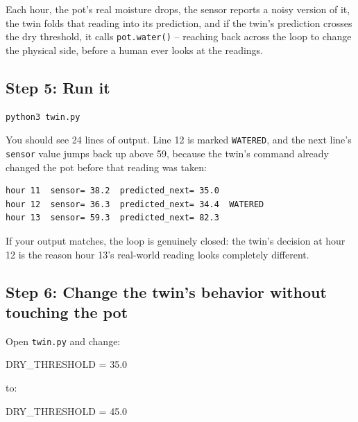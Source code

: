 \documentclass[
  12pt,
  a4paper,
]{article}
\newenvironment{Shaded}{}{}
\newcommand{\FloatTok}[1]{\textcolor[rgb]{0.25,0.63,0.44}{#1}}
\newcommand{\NormalTok}[1]{#1}
\newcommand{\OperatorTok}[1]{\textcolor[rgb]{0.40,0.40,0.40}{#1}}
\begin{document}
Each hour, the pot's real moisture drops, the sensor reports a noisy
version of it, the twin folds that reading into its prediction, and if
the twin's prediction crosses the dry threshold, it calls
\texttt{pot.water()} -- reaching back across the loop to change the
physical side, before a human ever looks at the readings.

\subsection{Step 5: Run it}\label{step-5-run-it}

\begin{verbatim}
python3 twin.py
\end{verbatim}

You should see 24 lines of output. Line 12 is marked \texttt{WATERED},
and the next line's \texttt{sensor} value jumps back up above 59,
because the twin's command already changed the pot before that reading
was taken:

\begin{verbatim}
hour 11  sensor= 38.2  predicted_next= 35.0
hour 12  sensor= 36.3  predicted_next= 34.4  WATERED
hour 13  sensor= 59.3  predicted_next= 82.3
\end{verbatim}

If your output matches, the loop is genuinely closed: the twin's
decision at hour 12 is the reason hour 13's real-world reading looks
completely different.

\subsection{Step 6: Change the twin's behavior without touching the
pot}\label{step-6-change-the-twins-behavior-without-touching-the-pot}

Open \texttt{twin.py} and change:

\begin{Shaded}
\begin{Highlighting}[]
\NormalTok{    DRY\_THRESHOLD }\OperatorTok{=} \FloatTok{35.0}
\end{Highlighting}
\end{Shaded}

to:

\begin{Shaded}
\begin{Highlighting}[]
\NormalTok{    DRY\_THRESHOLD }\OperatorTok{=} \FloatTok{45.0}
\end{Highlighting}
\end{Shaded}
\end{document}
